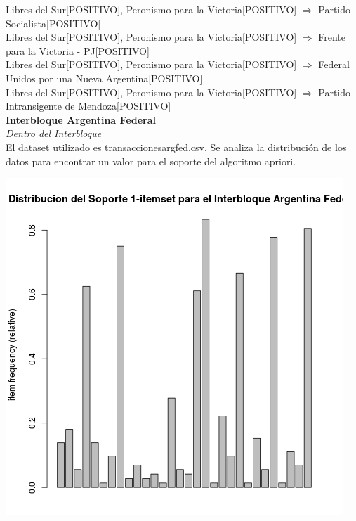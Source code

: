 \documentclass{endm}
\begin{document}
{Libres del Sur[POSITIVO], Peronismo para la Victoria[POSITIVO]} $\Longrightarrow$ {Partido Socialista[POSITIVO]} \\

{Libres del Sur[POSITIVO], Peronismo para la Victoria[POSITIVO]} $\Longrightarrow$ {Frente para la Victoria - PJ[POSITIVO]} \\

{Libres del Sur[POSITIVO], Peronismo para la Victoria[POSITIVO]} $\Longrightarrow$ {Federal Unidos por una Nueva Argentina[POSITIVO]} \\

{Libres del Sur[POSITIVO], Peronismo para la Victoria[POSITIVO]} $\Longrightarrow$ {Partido Intransigente de Mendoza[POSITIVO]} \\

\textbf{Interbloque Argentina Federal}\\

\textit{Dentro del Interbloque} \\

El dataset utilizado es transaccionesargfed.csv. Se analiza la distribución de los datos para encontrar un valor para el soporte del algoritmo apriori. \\

\begin{center}
\includegraphics[scale=0.4]{graficos/soportesInterbloquesArgentinaFederal.png}
\end{center}
\end{document}

